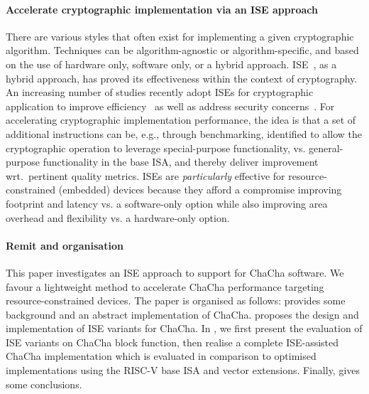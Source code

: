 \paragraph{Accelerate cryptographic implementation via an ISE approach}
There are various styles that often exist for implementing a given cryptographic algorithm. 
Techniques can be algorithm-agnostic or algorithm-specific, and based on the use of hardware only, software only, or a hybrid approach. 
ISE~\cite{GalBer:11,BarGioMar:09,RegIen:16}, as a hybrid approach, has proved its effectiveness within the context of cryptography. 
An increasing number of studies recently adopt ISEs for cryptographic application to improve efficiency~\cite{RCB:20,MNPSW:21} as well as address security concerns~\cite{GMPP:20}. 
For accelerating cryptographic implementation performance,
the idea is that a set of additional instructions can be, e.g., through benchmarking, identified 
to allow the cryptographic operation to leverage special-purpose functionality, 
vs. general-purpose functionality in the base ISA, and thereby deliver improvement wrt.\ pertinent quality metrics.
ISEs are {\em particularly} effective for resource-constrained (embedded) devices 
because they afford a compromise improving footprint and latency vs. a software-only option 
while also improving area overhead and flexibility vs. a hardware-only option.

\paragraph{Remit and organisation}
This paper investigates an ISE approach to support for ChaCha software. We favour a lightweight method to accelerate ChaCha performance targeting resource-constrained devices. The paper is organised as follows:
 provides some background and an abstract implementation of ChaCha.
 proposes the design and implementation of ISE variants for ChaCha. 
In , we first present the evaluation of ISE variants on ChaCha block function, then realise a complete ISE-assisted ChaCha implementation which is evaluated in comparison to optimised implementations using the RISC-V base ISA and vector extensions. 
Finally,  gives some conclusions.
